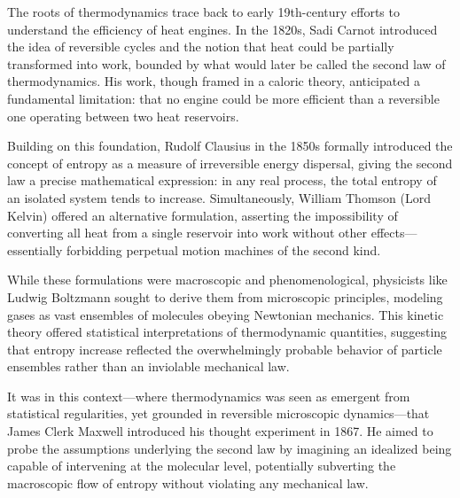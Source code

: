 \begin{historical}
The roots of thermodynamics trace back to early 19th-century efforts to understand the efficiency of heat engines. In the 1820s, Sadi Carnot introduced the idea of reversible cycles and the notion that heat could be partially transformed into work, bounded by what would later be called the second law of thermodynamics. His work, though framed in a caloric theory, anticipated a fundamental limitation: that no engine could be more efficient than a reversible one operating between two heat reservoirs.

Building on this foundation, Rudolf Clausius in the 1850s formally introduced the concept of entropy as a measure of irreversible energy dispersal, giving the second law a precise mathematical expression: in any real process, the total entropy of an isolated system tends to increase. Simultaneously, William Thomson (Lord Kelvin) offered an alternative formulation, asserting the impossibility of converting all heat from a single reservoir into work without other effects—essentially forbidding perpetual motion machines of the second kind.

While these formulations were macroscopic and phenomenological, physicists like Ludwig Boltzmann sought to derive them from microscopic principles, modeling gases as vast ensembles of molecules obeying Newtonian mechanics. This kinetic theory offered statistical interpretations of thermodynamic quantities, suggesting that entropy increase reflected the overwhelmingly probable behavior of particle ensembles rather than an inviolable mechanical law.

It was in this context—where thermodynamics was seen as emergent from statistical regularities, yet grounded in reversible microscopic dynamics—that James Clerk Maxwell introduced his thought experiment in 1867. He aimed to probe the assumptions underlying the second law by imagining an idealized being capable of intervening at the molecular level, potentially subverting the macroscopic flow of entropy without violating any mechanical law.
\end{historical}
